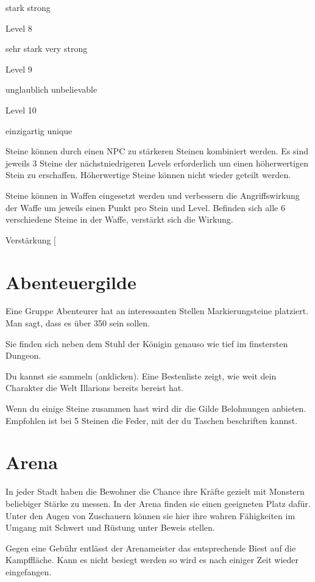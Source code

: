 \documentclass[a4paper,11pt]{book}
\begin{document}
stark  strong

Level 8

sehr stark  very strong

Level 9

unglaublich unbelievable

Level 10

einzigartig  unique

Steine können durch einen NPC zu stärkeren Steinen kombiniert werden. Es sind jeweils 3 Steine der nächstniedrigeren Levels erforderlich um einen höherwertigen Stein zu erschaffen. Höherwertige Steine können nicht wieder geteilt werden.

Steine können in Waffen eingesetzt werden und verbessern die Angriffswirkung der Waffe um jeweils einen Punkt pro Stein und Level. Befinden sich alle 6 verschiedene Steine in der Waffe, verstärkt sich die Wirkung.

Verstärkung [%

\section{Abenteuergilde}

Eine Gruppe Abenteurer hat an interessanten Stellen Markierungsteine platziert. Man sagt, dass es über 350 sein sollen.

Sie finden sich neben dem Stuhl der Königin genauso wie tief im finstersten Dungeon.

Du kannst sie sammeln (anklicken). Eine Bestenliste zeigt, wie weit dein Charakter die Welt Illarions bereits bereist hat.

Wenn du einige Steine zusammen hast wird dir die Gilde Belohnungen anbieten. Empfohlen ist bei 5 Steinen die Feder, mit der du Taschen beschriften kannst.

\section{Arena}

In jeder Stadt haben die Bewohner die Chance ihre Kräfte gezielt mit Monstern beliebiger Stärke zu messen. In der Arena finden sie einen geeigneten Platz dafür. Unter den Augen von Zuschauern können sie hier ihre wahren Fähigkeiten im Umgang mit Schwert und Rüstung unter Beweis stellen.

Gegen eine Gebühr entlässt der Arenameister das entsprechende Biest auf die Kampffläche. Kann es nicht besiegt werden so wird es nach einiger Zeit wieder eingefangen.
\end{document}
